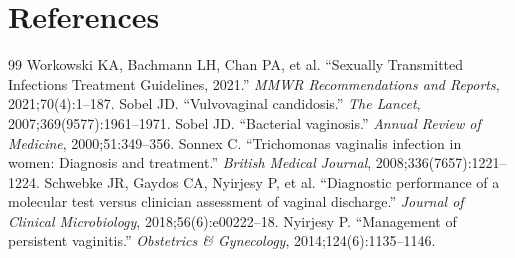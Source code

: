 \section*{References}
\begin{thebibliography}{99}
 Workowski KA, Bachmann LH, Chan PA, et al. ``Sexually Transmitted Infections Treatment Guidelines, 2021.'' \textit{MMWR Recommendations and Reports}, 2021;70(4):1--187.
 Sobel JD. ``Vulvovaginal candidosis.'' \textit{The Lancet}, 2007;369(9577):1961--1971.
 Sobel JD. ``Bacterial vaginosis.'' \textit{Annual Review of Medicine}, 2000;51:349--356.
 Sonnex C. ``Trichomonas vaginalis infection in women: Diagnosis and treatment.'' \textit{British Medical Journal}, 2008;336(7657):1221--1224.
 Schwebke JR, Gaydos CA, Nyirjesy P, et al. ``Diagnostic performance of a molecular test versus clinician assessment of vaginal discharge.'' \textit{Journal of Clinical Microbiology}, 2018;56(6):e00222--18.
 Nyirjesy P. ``Management of persistent vaginitis.'' \textit{Obstetrics \& Gynecology}, 2014;124(6):1135--1146.
\end{thebibliography}
